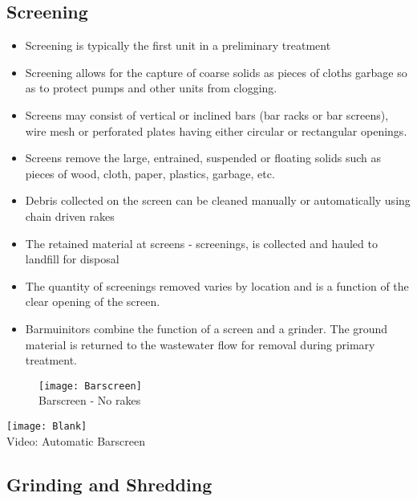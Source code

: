 		\subsection{Screening}
					\begin{itemize}
						\item Screening is typically the first unit in a preliminary treatment
						\item Screening allows for the capture of coarse solids as pieces of cloths garbage so as to protect pumps and other units from clogging. 
						\item Screens may consist of vertical or inclined bars (bar racks or bar screens), wire mesh or perforated plates having either circular or rectangular openings. 
						\item Screens remove the large, entrained, suspended or floating solids such as pieces of wood, cloth, paper, plastics, garbage, etc.
						\item Debris collected on the screen can be cleaned manually or automatically using chain driven rakes 
						\item The retained material at screens - screenings, is collected and hauled to landfill for disposal
						\item The quantity of screenings removed varies by location and is a function of the clear opening of the screen.
						\item Barmuinitors combine the function of a screen and a grinder.  The ground material is returned to the wastewater flow for removal during primary treatment.
					\end{itemize}

\begin{figure}
\begin{center}
    \texttt{[image: Barscreen]}\\

Barscreen - No rakes
\end{center}
  \end{figure}
  
 \begin{center}
    \texttt{[image: Blank]}\\
\hspace{0cm} Video: Automatic Barscreen
  \end{center}
 
		\subsection{Grinding and Shredding}

